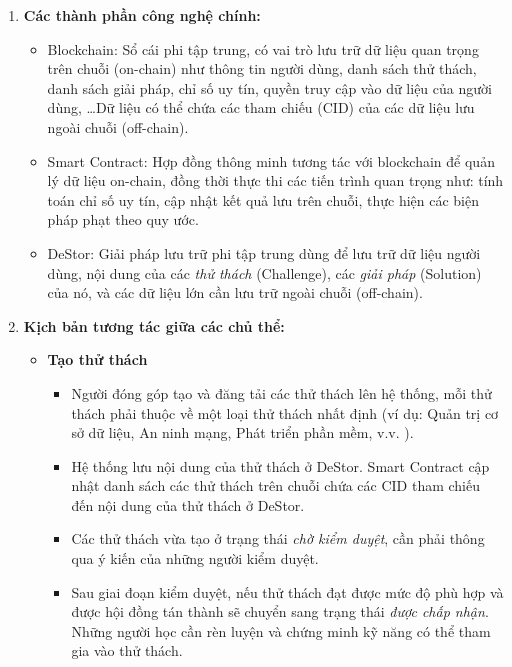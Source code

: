 \begin{enumerate}[label=\textbf{\alph*.}]
  \item \textbf{Các thành phần công nghệ chính:}
        \begin{itemize}
          \item Blockchain: Sổ cái phi tập trung, có vai trò lưu trữ dữ liệu quan trọng trên chuỗi (on-chain) như thông tin người dùng, danh sách thử thách, danh sách giải pháp, chỉ số uy tín, quyền truy cập vào dữ liệu của người dùng, \dots Dữ liệu có thể chứa các tham chiếu (CID) của các dữ liệu lưu ngoài chuỗi (off-chain).
          \item Smart Contract: Hợp đồng thông minh tương tác với blockchain để quản lý dữ liệu on-chain, đồng thời thực thi các tiến trình quan trọng như: tính toán chỉ số uy tín, cập nhật kết quả lưu trên chuỗi, thực hiện các biện pháp phạt theo quy ước.
          \item DeStor: Giải pháp lưu trữ phi tập trung dùng để lưu trữ dữ liệu người dùng, nội dung của các \textit{thử thách} (Challenge), các \textit{giải pháp} (Solution) của nó, và các dữ liệu lớn cần lưu trữ ngoài chuỗi (off-chain).
        \end{itemize}

  \item \textbf{Kịch bản tương tác giữa các chủ thể:}
        \begin{itemize}
          \item \textbf{Tạo thử thách}
                \begin{itemize}
                  \item Người đóng góp tạo và đăng tải các thử thách lên hệ thống, mỗi thử thách phải thuộc về một loại thử thách nhất định (ví dụ: Quản trị cơ sở dữ liệu, An ninh mạng, Phát triển phần mềm, v.v. ).
                  \item Hệ thống lưu nội dung của thử thách ở DeStor. Smart Contract cập nhật danh sách các thử thách trên chuỗi chứa các CID tham chiếu đến nội dung của thử thách ở DeStor.
                  \item Các thử thách vừa tạo ở trạng thái \textit{chờ kiểm duyệt}, cần phải thông qua ý kiến của những người kiểm duyệt.
                  \item Sau giai đoạn kiểm duyệt, nếu thử thách đạt được mức độ phù hợp và được hội đồng tán thành sẽ chuyển sang trạng thái \textit{được chấp nhận}. Những người học cần rèn luyện và chứng minh kỹ năng có thể tham gia vào thử thách.
                \end{itemize}


\end{itemize}
\end{enumerate}
